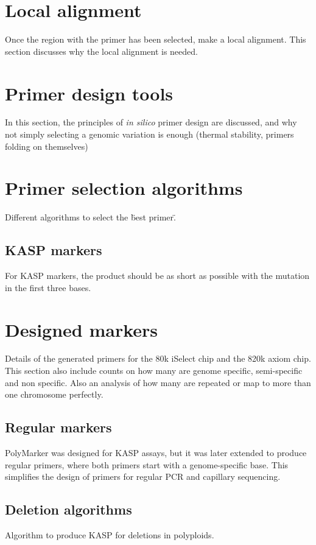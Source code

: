 \section{Local alignment} 
Once the region with the primer has been selected, make a local alignment. This section discusses why the local alignment is needed. 

\section{Primer design tools} 
In this section, the principles of \textit{in silico} primer design are discussed, and why not simply selecting a genomic variation is enough (thermal stability, primers folding on themselves)

\section{Primer selection algorithms} 
Different algorithms to select the \"best primer\". 

\subsection{KASP markers} 
For KASP markers, the product should be as short as possible with the mutation in the first three bases. 

\section{Designed markers} Details of the generated primers for the 80k iSelect chip and the 820k axiom chip. This section also include counts on how many are genome specific, semi-specific and non specific. Also an analysis of how many are repeated or map to more than one chromosome perfectly.

\subsection{Regular markers}  
PolyMarker was designed for KASP assays, but it was later extended to produce regular primers, where both primers start with a genome-specific base. This simplifies the design of primers for regular PCR and capillary sequencing. 




\subsection{Deletion algorithms}
Algorithm to produce KASP for deletions in polyploids. 

